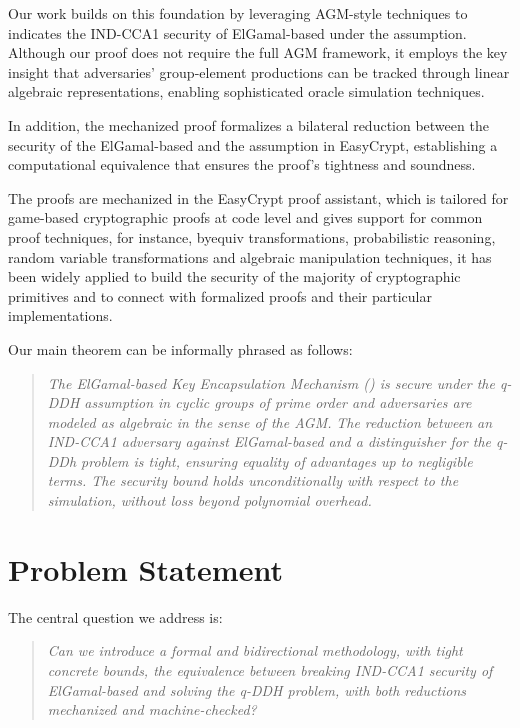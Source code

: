 Our work builds on this foundation by leveraging AGM-style techniques to indicates the IND-CCA1 security of ElGamal-based \KEM under the \qDDH assumption. Although our proof does not require the full AGM framework, it employs the key insight that adversaries' group-element productions can be tracked through linear algebraic representations, enabling sophisticated oracle simulation techniques.

In addition, the mechanized proof formalizes a bilateral reduction between the \INDCCAone security of the ElGamal-based \KEM and the \qDDH assumption in EasyCrypt, establishing a computational equivalence that ensures the proof’s tightness and soundness.

The proofs are mechanized in the EasyCrypt proof assistant\cite{easycrypt}, which is tailored for game-based cryptographic proofs at code level and gives support for common proof techniques, for instance, byequiv transformations, probabilistic reasoning, random variable transformations and algebraic manipulation techniques, it has been widely applied to build the security of the majority of cryptographic primitives and to connect with formalized proofs and their particular implementations.

Our main theorem can be informally phrased as follows:
\begin{quote}
\emph{The ElGamal-based Key Encapsulation Mechanism (\KEM) is \INDCCAone secure under the q-DDH assumption in cyclic groups of prime order and adversaries are modeled as algebraic in the sense of the AGM\cite{fuchsbauer2018}.}
\emph{The reduction between an IND-CCA1 adversary against ElGamal-based \KEM and a distinguisher for the q-DDh problem is tight, ensuring equality of advantages up to negligible terms. The security bound holds unconditionally with respect to the simulation, without loss beyond polynomial overhead. }
\end{quote}






\section{Problem Statement}

The central question we address is:

\begin{quote}
\emph{Can we introduce a formal and bidirectional methodology, with tight concrete bounds, the equivalence between breaking IND-CCA1 security of ElGamal-based \KEM and solving the q-DDH problem, with both  reductions mechanized and machine-checked?}
\end{quote}


